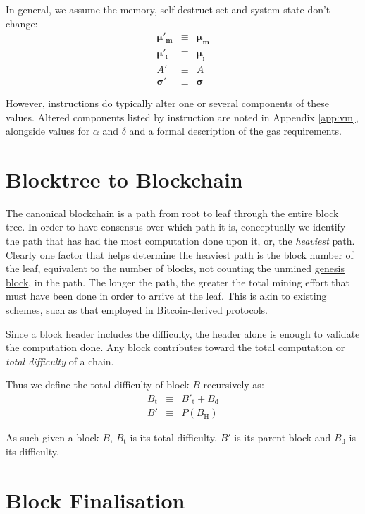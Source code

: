 \documentclass[9pt,oneside]{amsart}
\begin{document}
\begin{multicols}{2}
In general, we assume the memory, self-destruct set and system state don't change:
\begin{eqnarray}
\boldsymbol{\mu}'_{\mathbf{m}} & \equiv & \boldsymbol{\mu}_{\mathbf{m}} \\
\boldsymbol{\mu}'_{\mathrm{i}} & \equiv & \boldsymbol{\mu}_{\mathrm{i}} \\
A' & \equiv & A \\
\boldsymbol{\sigma}' & \equiv & \boldsymbol{\sigma}
\end{eqnarray}

However, instructions do typically alter one or several components of these values. Altered components listed by instruction are noted in Appendix \ref{app:vm}, alongside values for $\alpha$ and $\delta$ and a formal description of the gas requirements.

\section{Blocktree to Blockchain} \label{ch:ghost}

The canonical blockchain is a path from root to leaf through the entire block tree. In order to have consensus over which path it is, conceptually we identify the path that has had the most computation done upon it, or, the \textit{heaviest} path. Clearly one factor that helps determine the heaviest path is the block number of the leaf, equivalent to the number of blocks, not counting the unmined \hyperlink{Genesis_Block}{genesis block}, in the path. The longer the path, the greater the total mining effort that must have been done in order to arrive at the leaf. This is akin to existing schemes, such as that employed in Bitcoin-derived protocols.

Since a block header includes the difficulty, the header alone is enough to validate the computation done. Any block contributes toward the total computation or \textit{total difficulty} of a chain.

Thus we define the total difficulty of block $B$ recursively as:
\begin{eqnarray}
B_{\mathrm{t}} & \equiv & B'_{\mathrm{t}} + B_{\mathrm{d}} \\
B' & \equiv & P(B_{\mathrm{H}})
\end{eqnarray}

As such given a block $B$, $B_{\mathrm{t}}$ is its total difficulty, $B'$ is its parent block and $B_{\mathrm{d}}$ is its difficulty.

\section{Block Finalisation} \label{ch:finalisation}


\end{multicols}
\end{document}
